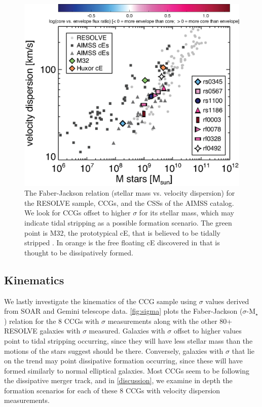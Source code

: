 \documentclass[iop,apj]{emulateapj}
\begin{document}
 \begin{figure}[b]
\begin{center}
\includegraphics{faber-jackson_resolvesigmas.eps}
\caption{The Faber-Jackson relation (stellar mass vs. velocity dispersion) for the RESOLVE sample, CCGs, and the CSSs of the AIMSS catalog. We look for CCGs offset to higher $\sigma$ for its stellar mass, which may indicate tidal stripping as a possible formation scenario. The green point is M32, the prototypical cE, that is believed to be tidally stripped \citep{Faber1973}. In orange is the free floating cE discovered in \citet{Huxor2013} that is thought to be dissipatively formed.}
\label{fig:sigma}
\end{center}
\end{figure}
 
\subsection{Kinematics}
\label{kin}
 We lastly investigate the kinematics of the CCG sample using $\sigma$ values derived from SOAR and Gemini telescope data. \autoref{fig:sigma} plots the Faber-Jackson ($\sigma$-M$_{\star}$) relation for the 8 CCGs with $\sigma$ measurements along with the other 80+ RESOLVE galaxies with $\sigma$ measured. Galaxies with $\sigma$ offset to higher values point to tidal stripping occurring, since they will have less stellar mass than the motions of the stars suggest should be there. Conversely, galaxies with $\sigma$ that lie on the trend may point dissipative formation occurring, since these will have formed similarly to normal elliptical galaxies. Most CCGs seem to be following the dissipative merger track, and in \autoref{discussion}, we examine in depth the formation scenarios for each of these 8 CCGs with velocity dispersion measurements.
\end{document}
